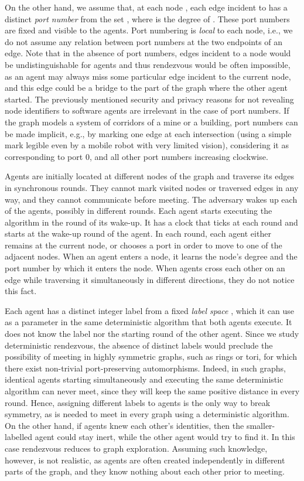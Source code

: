 \documentclass{llncs}
\begin{document}
On the other hand, we assume that, at each node ,
each edge incident to  has a distinct {\em port number} from the set 
, where  is the degree of . These port numbers are fixed and visible to the agents.
Port numbering is {\em local} to each node, i.e., we do not assume any relation between
port numbers at  the two endpoints of an edge. Note that in the absence of port numbers, edges incident to a node
would be undistinguishable for agents and thus rendezvous would be often impossible, 
as an agent may always miss some particular edge incident to the current node, and this edge could be a bridge to the part of the graph
where the other agent started.
The previously mentioned security and privacy reasons for not revealing node identifiers to software agents are irrelevant in the case of port numbers. If
the graph models a system of corridors of a mine or a building, 
port numbers can be made implicit, e.g., by marking one edge at each intersection
(using a simple mark legible even by a mobile robot with very limited vision),
considering it as corresponding to port 0, and all other port numbers increasing clockwise.
 

Agents are initially located at different nodes of the graph and  traverse its edges in synchronous rounds.
They cannot mark visited nodes or traversed edges in any way, and they cannot communicate before meeting.
The adversary wakes up each of the agents, possibly in different rounds. 
Each agent starts executing the algorithm in the round of its wake-up.
It has a clock that ticks at each round and starts at the wake-up round of the agent.
In each round, each agent either remains at the current node,
or chooses a port in order to move to one of the adjacent nodes. 
When an agent enters a node, it learns the node's degree and the port  number by which it enters the node. When agents cross each other
on an edge while traversing it simultaneously in different directions, they do not notice this fact.

Each agent has a distinct integer label from a fixed {\em label space} , which it can
use as a parameter in the same deterministic algorithm that both agents execute. It does not know the label nor the starting round of the other agent. 
Since we study deterministic rendezvous, the absence of distinct labels would preclude the possibility of meeting in highly
symmetric graphs, such as rings or tori, for which there exist non-trivial port-preserving automorphisms. Indeed, in such graphs,
identical agents starting simultaneously and executing the same deterministic algorithm can never meet, since they will keep the same positive distance in every round. 
Hence, assigning different labels to agents is the only way to break symmetry, as is needed to meet in every graph using a deterministic algorithm. 
On the other hand, if agents knew
each other's identities, then the smaller-labelled agent could stay inert, while the other agent would try to find it. In this case rendezvous reduces to graph exploration.   
Assuming such knowledge, however, is not realistic, as agents are often created independently in different parts of the graph, and they know nothing about each other
prior to meeting.
\end{document}
